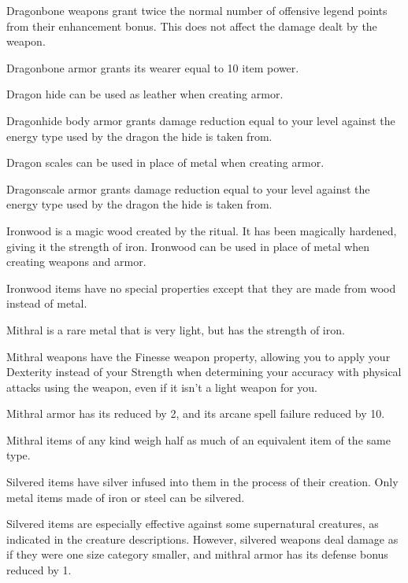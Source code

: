         Dragonbone weapons grant twice the normal number of offensive legend points from their enhancement bonus.
        This does not affect the damage dealt by the weapon.

        Dragonbone armor grants its wearer  equal to 10 \add item power.


        Dragon hide can be used as leather when creating armor.

        Dragonhide body armor grants damage reduction equal to your level against the energy type used by the dragon the hide is taken from.


        Dragon scales can be used in place of metal when creating armor.

        Dragonscale armor grants damage reduction equal to your level against the energy type used by the dragon the hide is taken from.

        Ironwood is a magic wood created by the  ritual.
        It has been magically hardened, giving it the strength of iron.
        Ironwood can be used in place of metal when creating weapons and armor.

        Ironwood items have no special properties except that they are made from wood instead of metal.

        Mithral is a rare metal that is very light, but has the strength of iron.

        Mithral weapons have the Finesse weapon property, allowing you to apply your Dexterity instead of your Strength when determining your accuracy with physical attacks using the weapon, even if it isn't a light weapon for you.

        Mithral armor has its  reduced by 2, and its arcane spell failure reduced by 10.

        Mithral items of any kind weigh half as much of an equivalent item of the same type.


        Silvered items have silver infused into them in the process of their creation.
        Only metal items made of iron or steel can be silvered.

        Silvered items are especially effective against some supernatural creatures, as indicated in the creature descriptions.
        However, silvered weapons deal damage as if they were one size category smaller, and mithral armor has its defense bonus reduced by 1.

